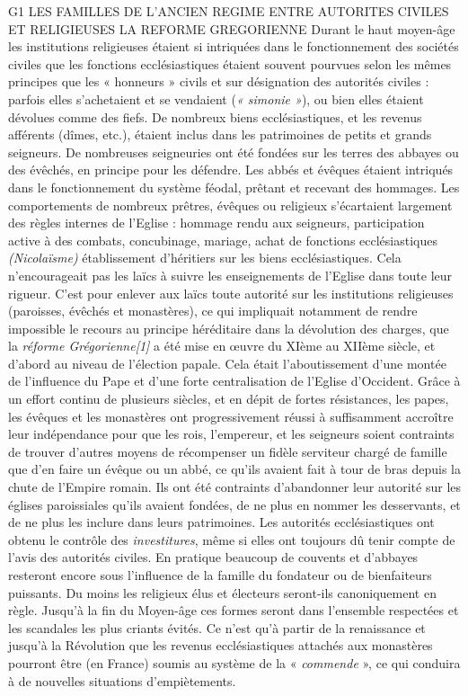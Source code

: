 G1 LES FAMILLES DE L'ANCIEN REGIME ENTRE AUTORITES CIVILES ET RELIGIEUSES
LA REFORME GREGORIENNE 
 Durant le haut moyen-âge les institutions religieuses étaient si intriquées dans le fonctionnement des sociétés civiles que les fonctions ecclésiastiques étaient souvent pourvues selon les mêmes principes que les « honneurs » civils et sur désignation des autorités civiles : parfois elles s'achetaient et se vendaient (\emph{« simonie »}), ou bien elles étaient dévolues comme des fiefs. De nombreux biens ecclésiastiques, et les revenus afférents (dîmes, etc.), étaient inclus dans les patrimoines de petits et grands seigneurs. De nombreuses seigneuries ont été fondées sur les terres des abbayes ou des évêchés, en principe pour les défendre. Les abbés et évêques étaient intriqués dans le fonctionnement du système féodal, prêtant et recevant des hommages. Les comportements de nombreux prêtres, évêques ou religieux s'écartaient largement des règles internes de l'Eglise : hommage rendu aux seigneurs, participation active à des combats, concubinage, mariage, achat de fonctions ecclésiastiques \emph{(Nicolaïsme)} établissement d'héritiers sur les biens ecclésiastiques. Cela n'encourageait pas les laïcs à suivre les enseignements de l'Eglise dans toute leur rigueur. 
 C'est pour enlever aux laïcs toute autorité sur les institutions religieuses (paroisses, évêchés et monastères), ce qui impliquait notamment de rendre impossible le recours au principe héréditaire dans la dévolution des charges, que la \emph{réforme Grégorienne[1]} a été mise en œuvre du XIème au XIIème siècle, et d'abord au niveau de l'élection papale. Cela était l'aboutissement d'une montée de l'influence du Pape et d'une forte centralisation de l'Eglise d'Occident. 
 Grâce à un effort continu de plusieurs siècles, et en dépit de fortes résistances, les papes, les évêques et les monastères ont progressivement réussi à suffisamment accroître leur indépendance pour que les rois, l'empereur, et les seigneurs soient contraints de trouver d'autres moyens de récompenser un fidèle serviteur chargé de famille que d'en faire un évêque ou un abbé, ce qu'ils avaient fait à tour de bras depuis la chute de l'Empire romain. Ils ont été contraints d'abandonner leur autorité sur les églises paroissiales qu'ils avaient fondées, de ne plus en nommer les desservants, et de ne plus les inclure dans leurs patrimoines. Les autorités ecclésiastiques ont obtenu le contrôle des \emph{investitures}, même si elles ont toujours dû tenir compte de l'avis des autorités civiles. 
 En pratique beaucoup de couvents et d'abbayes resteront encore sous l'influence de la famille du fondateur ou de bienfaiteurs puissants. Du moins les religieux élus et électeurs seront-ils canoniquement en règle. Jusqu'à la fin du Moyen-âge ces formes seront dans l'ensemble respectées et les scandales les plus criants évités. Ce n'est qu'à partir de la renaissance et jusqu'à la Révolution que les revenus ecclésiastiques attachés aux monastères pourront être (en France) soumis au système de la « \emph{commende} », ce qui conduira à de nouvelles situations d'empiètements.
